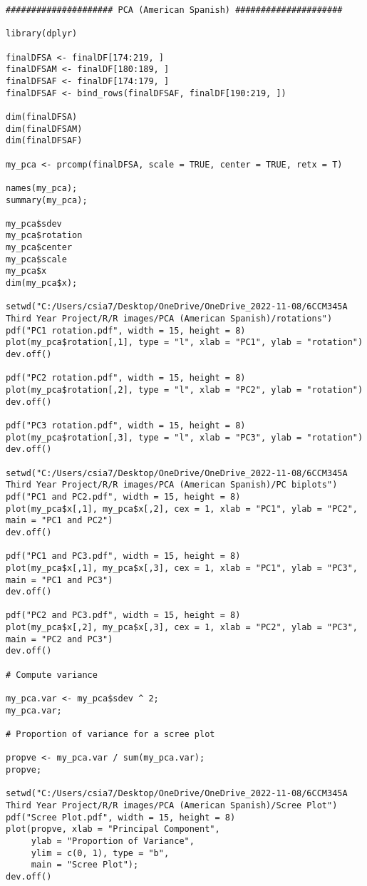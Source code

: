 \begin{verbatim}
##################### PCA (American Spanish) #####################

library(dplyr)

finalDFSA <- finalDF[174:219, ]
finalDFSAM <- finalDF[180:189, ]
finalDFSAF <- finalDF[174:179, ]
finalDFSAF <- bind_rows(finalDFSAF, finalDF[190:219, ])

dim(finalDFSA)
dim(finalDFSAM)
dim(finalDFSAF)

my_pca <- prcomp(finalDFSA, scale = TRUE, center = TRUE, retx = T)

names(my_pca);
summary(my_pca);

my_pca$sdev
my_pca$rotation
my_pca$center
my_pca$scale
my_pca$x
dim(my_pca$x);

setwd("C:/Users/csia7/Desktop/OneDrive/OneDrive_2022-11-08/6CCM345A Third Year Project/R/R images/PCA (American Spanish)/rotations")
pdf("PC1 rotation.pdf", width = 15, height = 8) 
plot(my_pca$rotation[,1], type = "l", xlab = "PC1", ylab = "rotation")
dev.off()

pdf("PC2 rotation.pdf", width = 15, height = 8) 
plot(my_pca$rotation[,2], type = "l", xlab = "PC2", ylab = "rotation")
dev.off()

pdf("PC3 rotation.pdf", width = 15, height = 8) 
plot(my_pca$rotation[,3], type = "l", xlab = "PC3", ylab = "rotation")
dev.off()

setwd("C:/Users/csia7/Desktop/OneDrive/OneDrive_2022-11-08/6CCM345A Third Year Project/R/R images/PCA (American Spanish)/PC biplots")
pdf("PC1 and PC2.pdf", width = 15, height = 8) 
plot(my_pca$x[,1], my_pca$x[,2], cex = 1, xlab = "PC1", ylab = "PC2", main = "PC1 and PC2")
dev.off()

pdf("PC1 and PC3.pdf", width = 15, height = 8) 
plot(my_pca$x[,1], my_pca$x[,3], cex = 1, xlab = "PC1", ylab = "PC3", main = "PC1 and PC3")
dev.off()

pdf("PC2 and PC3.pdf", width = 15, height = 8) 
plot(my_pca$x[,2], my_pca$x[,3], cex = 1, xlab = "PC2", ylab = "PC3", main = "PC2 and PC3")
dev.off()

# Compute variance

my_pca.var <- my_pca$sdev ^ 2;
my_pca.var;

# Proportion of variance for a scree plot

propve <- my_pca.var / sum(my_pca.var);
propve;

setwd("C:/Users/csia7/Desktop/OneDrive/OneDrive_2022-11-08/6CCM345A Third Year Project/R/R images/PCA (American Spanish)/Scree Plot")
pdf("Scree Plot.pdf", width = 15, height = 8) 
plot(propve, xlab = "Principal Component",
     ylab = "Proportion of Variance",
     ylim = c(0, 1), type = "b",
     main = "Scree Plot");
dev.off()


\end{verbatim}
